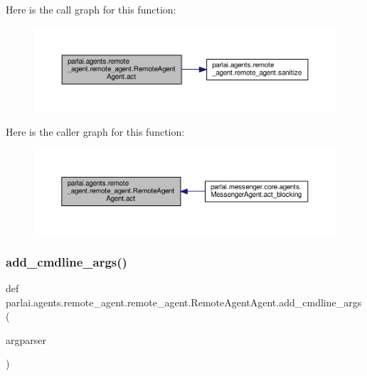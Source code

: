 Here is the call graph for this function\+:
\nopagebreak
\begin{figure}[H]
\begin{center}
\leavevmode
\includegraphics[width=350pt]{classparlai_1_1agents_1_1remote__agent_1_1remote__agent_1_1RemoteAgentAgent_a8ef2da61732681b2d107032b4a781441_cgraph}
\end{center}
\end{figure}
Here is the caller graph for this function\+:
\nopagebreak
\begin{figure}[H]
\begin{center}
\leavevmode
\includegraphics[width=350pt]{classparlai_1_1agents_1_1remote__agent_1_1remote__agent_1_1RemoteAgentAgent_a8ef2da61732681b2d107032b4a781441_icgraph}
\end{center}
\end{figure}
\mbox{\label{classparlai_1_1agents_1_1remote__agent_1_1remote__agent_1_1RemoteAgentAgent_ae58e61ee7d8f6373b38389b2e832924b}} 
\subsubsection{\texorpdfstring{add\+\_\+cmdline\+\_\+args()}{add\_cmdline\_args()}}
{\footnotesize\ttfamily def parlai.\+agents.\+remote\+\_\+agent.\+remote\+\_\+agent.\+Remote\+Agent\+Agent.\+add\+\_\+cmdline\+\_\+args (\begin{DoxyParamCaption}\item[{}]{argparser }\end{DoxyParamCaption})\hspace{0.3cm}{\ttfamily [static]}}




